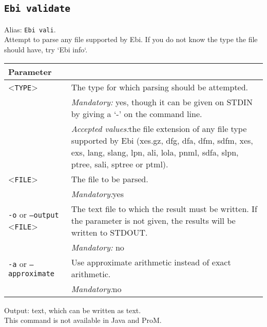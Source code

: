 {\subsection{\texttt{Ebi validate}}
\label{command:Ebi validate}
Alias: \texttt{Ebi vali}.\\
Attempt to parse any file supported by Ebi. If you do not know the type the file should have, try `Ebi info`.\\
\begin{tabularx}{\linewidth}{lX}
\toprule
Parameter \\\midrule
<\texttt{TYPE}>&The type for which parsing should be attempted.\\
&\textit{Mandatory:} \quad yes, though it can be given on STDIN by giving a `-' on the command line.\\
&\textit{Accepted values:}\quad the file extension of any file type supported by Ebi (xes.gz, dfg, dfa, dfm, sdfm, xes, exs, lang, slang, lpn, ali, lola, pnml, sdfa, slpn, ptree, sali, sptree or ptml).\\
<\texttt{FILE}>
&The file to be parsed.\\
&\textit{Mandatory:}\quad yes\\
\texttt{-o} or \texttt{--output} <\texttt{FILE}> &
The text file to which the result must be written. If the parameter is not given, the results will be written to STDOUT.\\
&\textit{Mandatory:} \quad no\\
\texttt{-a} or \texttt{--approximate} & Use approximate arithmetic instead of exact arithmetic.\\
&\textit{Mandatory:}\quad no\\
\bottomrule
\end{tabularx}
\noindent Output: text, which can be written as  text.
\\This command is not available in Java and ProM.
}
